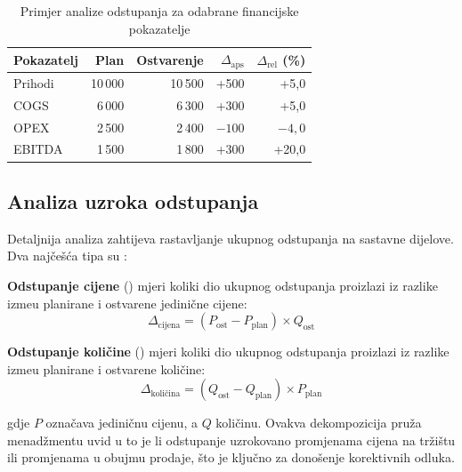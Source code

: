 \documentclass[zavrsnirad]{fer}
\begin{document}
\begin{table}[htb]
  \centering
  \caption{Primjer analize odstupanja za odabrane financijske pokazatelje}
  \label{tab:primjer_odstupanja}
  \begin{tabular}{lrrrr}
    \toprule
    \textbf{Pokazatelj} & \textbf{Plan} & \textbf{Ostvarenje} & \textbf{$\Delta_{\text{aps}}$} & \textbf{$\Delta_{\text{rel}}$ (\%)} \\
    \midrule
    Prihodi & 10\,000 & 10\,500 & +500 & +5{,}0 \\
    COGS & 6\,000 & 6\,300 & +300 & +5{,}0 \\
    OPEX & 2\,500 & 2\,400 & $-100$ & $-4{,}0$ \\
    EBITDA & 1\,500 & 1\,800 & +300 & +20{,}0 \\
    \bottomrule
  \end{tabular}
\end{table}

\subsection{Analiza uzroka odstupanja}
\label{subsec:uzroci_odstupanja}

Detaljnija analiza zahtijeva rastavljanje ukupnog odstupanja na sastavne dijelove. Dva naj\v{c}e\v{s}\'{c}a tipa su \citep{horngren2015cost}:

\textbf{Odstupanje cijene} () mjeri koliki dio ukupnog odstupanja proizlazi iz razlike izme\dj u planirane i ostvarene jedini\v{c}ne cijene:
\begin{equation}
    \Delta_{\text{cijena}} = (P_{\text{ost}} - P_{\text{plan}}) \times Q_{\text{ost}}
    \label{eq:price_variance}
\end{equation}

\textbf{Odstupanje koli\v{c}ine} () mjeri koliki dio ukupnog odstupanja proizlazi iz razlike izme\dj u planirane i ostvarene koli\v{c}ine:
\begin{equation}
    \Delta_{\text{koli\v{c}ina}} = (Q_{\text{ost}} - Q_{\text{plan}}) \times P_{\text{plan}}
    \label{eq:volume_variance}
\end{equation}

gdje $P$ ozna\v{c}ava jedini\v{c}nu cijenu, a $Q$ koli\v{c}inu. Ovakva dekompozicija pru\v{z}a menad\v{z}mentu uvid u to je li odstupanje uzrokovano promjenama cijena na tr\v{z}i\v{s}tu ili promjenama u obujmu prodaje, \v{s}to je klju\v{c}no za dono\v{s}enje korektivnih odluka.
\end{document}
